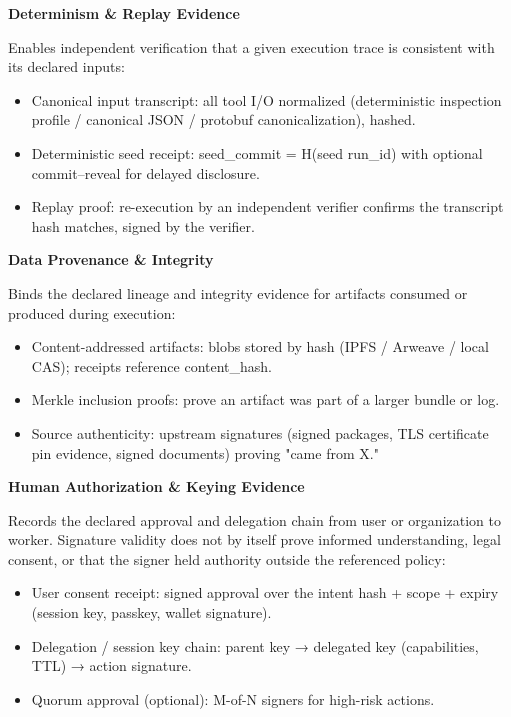 \documentclass[
  11pt,
]{article}
\providecommand{\tightlist}{%
  \setlength{\itemsep}{0pt}\setlength{\parskip}{0pt}}
\begin{document}
\textbf{Determinism \& Replay Evidence}

Enables independent verification that a given execution trace is
consistent with its declared inputs:

\begin{itemize}
\tightlist
\item
  Canonical input transcript: all tool I/O normalized (deterministic
  inspection profile / canonical JSON / protobuf canonicalization),
  hashed.
\item
  Deterministic seed receipt: seed\_commit = H(seed \textbar\textbar{}
  run\_id) with optional commit--reveal for delayed disclosure.
\item
  Replay proof: re-execution by an independent verifier confirms the
  transcript hash matches, signed by the verifier.
\end{itemize}

\textbf{Data Provenance \& Integrity}

Binds the declared lineage and integrity evidence for artifacts consumed or
produced during execution:

\begin{itemize}
\tightlist
\item
  Content-addressed artifacts: blobs stored by hash (IPFS / Arweave /
  local CAS); receipts reference content\_hash.
\item
  Merkle inclusion proofs: prove an artifact was part of a larger bundle
  or log.
\item
  Source authenticity: upstream signatures (signed packages, TLS
  certificate pin evidence, signed documents) proving "came from X."
\end{itemize}

\textbf{Human Authorization \& Keying Evidence}

Records the declared approval and delegation chain from user or organization
to worker. Signature validity does not by itself prove informed understanding,
legal consent, or that the signer held authority outside the referenced policy:

\begin{itemize}
\tightlist
\item
  User consent receipt: signed approval over the intent hash + scope +
  expiry (session key, passkey, wallet signature).
\item
  Delegation / session key chain: parent key → delegated key
  (capabilities, TTL) → action signature.
\item
  Quorum approval (optional): M-of-N signers for high-risk actions.
\end{itemize}
\end{document}
